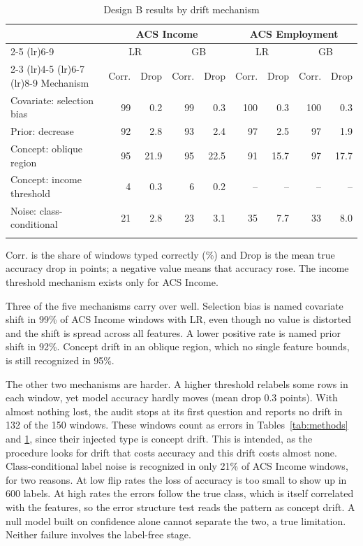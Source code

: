 \documentclass[pdflatex,referee,lineno,sn-basic]{sn-jnl}
\begin{document}
\begin{table}[!htbp]\centering\tablebodyfont
\caption{Design B results by drift mechanism}\label{tab:mechanisms}%
\begin{tabular}{@{}lrrrrrrrr@{}}
\toprule
 & \multicolumn{4}{c}{ACS Income} & \multicolumn{4}{c}{ACS Employment} \\
\cmidrule(lr){2-5}
\cmidrule(lr){6-9}
 & \multicolumn{2}{c}{LR} & \multicolumn{2}{c}{GB} & \multicolumn{2}{c}{LR} & \multicolumn{2}{c}{GB} \\
\cmidrule(lr){2-3}
\cmidrule(lr){4-5}
\cmidrule(lr){6-7}
\cmidrule(lr){8-9}
Mechanism & \multicolumn{1}{c}{Corr.} & \multicolumn{1}{c}{Drop} & \multicolumn{1}{c}{Corr.} & \multicolumn{1}{c}{Drop} & \multicolumn{1}{c}{Corr.} & \multicolumn{1}{c}{Drop} & \multicolumn{1}{c}{Corr.} & \multicolumn{1}{c}{Drop} \\
\midrule
Covariate: selection bias & 99 & 0.2 & 99 & 0.3 & 100 & \textminus{}0.3 & 100 & \textminus{}0.3 \\
Prior: decrease & 92 & \textminus{}2.8 & 93 & \textminus{}2.4 & 97 & 2.5 & 97 & 1.9 \\
Concept: oblique region & 95 & 21.9 & 95 & 22.5 & 91 & 15.7 & 97 & 17.7 \\
Concept: income threshold & 4 & \textminus{}0.3 & 6 & 0.2 & -- & -- & -- & -- \\
Noise: class-conditional & 21 & 2.8 & 23 & 3.1 & 35 & 7.7 & 33 & 8.0 \\
\botrule
\end{tabular}
\end{table}

Corr. is the share of windows typed correctly (\%) and Drop is the mean true accuracy drop in points; a negative value means that accuracy rose. The income threshold mechanism exists only for ACS Income.

Three of the five mechanisms carry over well. Selection bias is named covariate shift in 99\% of ACS Income windows with LR, even though no value is distorted and the shift is spread across all features. A lower positive rate is named prior shift in 92\%. Concept drift in an oblique region, which no single feature bounds, is still recognized in 95\%.

The other two mechanisms are harder. A higher threshold relabels some rows in each window, yet model accuracy hardly moves (mean drop \textminus{}0.3 points). With almost nothing lost, the audit stops at its first question and reports no drift in 132 of the 150 windows. These windows count as errors in Tables~\ref{tab:methods} and \ref{tab:mechanisms}, since their injected type is concept drift. This is intended, as the procedure looks for drift that costs accuracy and this drift costs almost none. Class-conditional label noise is recognized in only 21\% of ACS Income windows, for two reasons. At low flip rates the loss of accuracy is too small to show up in 600 labels. At high rates the errors follow the true class, which is itself correlated with the features, so the error structure test reads the pattern as concept drift. A null model built on confidence alone cannot separate the two, a true limitation. Neither failure involves the label-free stage.
\end{document}
